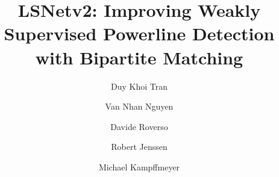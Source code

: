 \documentclass[journal]{IEEEtran}
\begin{document}
%
\title{LSNetv2: Improving Weakly Supervised Powerline Detection with Bipartite Matching}

\author[1,2]{Duy Khoi Tran}
\author[2]{Van Nhan Nguyen}
\author[2]{Davide Roverso}
\author[1]{Robert Jenssen}
\author[1]{Michael Kampffmeyer}

%
%
%


% 
%
\end{document}
